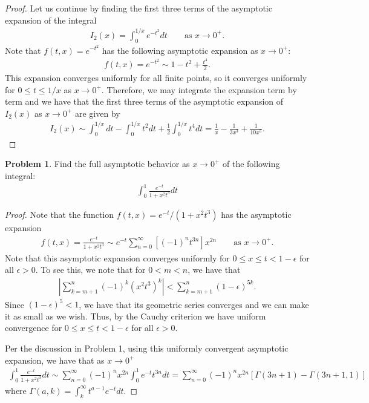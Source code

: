 \documentclass[12pt]{article}
\theoremstyle{definition}
\newtheorem{problem}{Problem}
\begin{document}
\begin{proof}
  Let us continue by finding the first three terms of the asymptotic expansion of the integral
  \begin{align*}
    I_2(x) = \int_0^{1/x} e^{-t^2}dt \qquad \text{as $x\to 0^+$}.
  \end{align*}
  Note that $f(t,x) = e^{-t^2}$ has the following asymptotic expansion
  as $x \to 0^+$:
  \begin{align*}
    f(t, x) = e^{-t^2} \sim 1 - t^2 + \frac{t^4}{2}.
  \end{align*}
  This expansion converges uniformly for all finite points, so it converges uniformly for $0 \leq t \leq 1/x$ as $x \to 0^+$.
  Therefore, we may integrate the expansion term by term and we have that the first three terms of the asymptotic expansion
  of $I_2(x)$ as $x\to 0^+$ are given by
  \begin{align*}
    I_2(x) \sim \int_0^{1/x}dt - \int_0^{1/x}t^2 dt + \frac{1}{2}\int_0^{1/x} t^4 dt = \frac{1}{x} - \frac{1}{3x^3} + \frac{1}{10x^5}.
  \end{align*}

\end{proof}
\newpage


\begin{problem}
  Find the full asymptotic behavior as $x \to 0^+$ of the following integral:
  \begin{align*}
    \int_{0}^1 \frac{e^{-t}}{1 + x^2t^3}dt
  \end{align*}
\end{problem}

\begin{proof}
  Note that the function $f(t,x) = e^{-t}/(1 + x^2t^3)$ has the asymptotic expansion
  \begin{align*}
    f(t,x) = \frac{e^{-t}}{1 + x^2t^3} \sim e^{-t}\sum_{n=0}^\infty \left[(-1)^n t^{3n}\right]x^{2n} \qquad \text{as $x\to0^+$.}
  \end{align*}
  Note that this asymptotic expansion converges uniformly for $0\leq x \leq t < 1-\epsilon$ for all $\epsilon > 0$. To see this,
  we note that for $0 < m < n$, we have that
  \begin{align*}
    \left|\sum_{k=m+1}^n(-1)^k (x^2 t^3)^k\right| < \sum_{k=m+1}^n (1-\epsilon)^{5k}.
  \end{align*}
  Since $(1-\epsilon)^5 < 1$, we have that its geometric series converges and we can make it as small as we wish. Thus, by
  the Cauchy criterion we have uniform convergence for $0\leq x \leq t < 1-\epsilon$ for all $\epsilon > 0$.

  Per the discussion in Problem 1, using this uniformly convergent asymptotic expansion, we have that
  as $x \to 0^+$
  \begin{align*}
    \int_{0}^1 \frac{e^{-t}}{1 + x^2t^3}dt\sim \sum_{n=0}^\infty (-1)^n x^{2n} \int_0^1 e^{-t}t^{3n} dt = \sum_{n=0}^\infty (-1)^n x^{2n} \left[\Gamma(3n+1) - \Gamma(3n+1, 1)\right]
  \end{align*}
  where $\Gamma(a,k) = \int_{k}^\infty t^{a-1}e^{-t} dt$.
\end{proof}
\newpage
\end{document}
